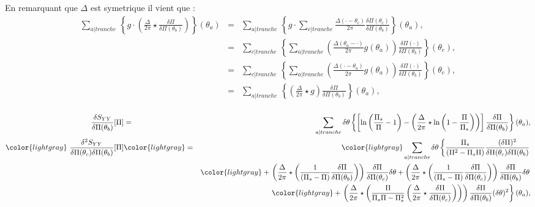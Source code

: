 %	
		
		En remarquant que $\Delta$ est symetrique il vient que : 
	\begin{eqnarray}
		\sum_{a\vert tranche}   \,  \left \{ g  \cdot  	\left  ( \frac{\Delta}{2\pi} \star  \frac{\delta \Pi}{\delta \Pi(\theta_b)} \right ) \right \}( \theta_a) & = & \sum_{a\vert tranche}   \,  \left \{ g  \cdot  \sum_{c\vert tranche}    	
		 \frac{\Delta ( \cdot - \theta_c)}{2\pi}  \frac{\delta \Pi (\theta_c) }{\delta \Pi(\theta_b)}\right \}( \theta_a),\\
		 & = & \sum_{c\vert tranche}   \,  \left \{  \sum_{a\vert tranche}      	
		  \left ( \frac{\Delta ( \theta_a - \cdot )}{2\pi}  g ( \theta_a) \right ) \frac{\delta \Pi (\cdot) }{\delta \Pi(\theta_b)}\right \}( \theta_c),\\
		  & = & \sum_{c\vert tranche}  \,  \left \{  \sum_{a\vert tranche}      	
		  \left ( \frac{\Delta ( \cdot - \theta_a)}{2\pi}  g ( \theta_a) \right ) \frac{\delta \Pi (\cdot) }{\delta \Pi(\theta_b)}\right \}( \theta_c),\\
		  & = & \sum_{a\vert tranche}   \,  \left \{        	
		  \left ( \frac{\Delta}{2\pi}   \star g \right ) \frac{\delta \Pi  }{\delta \Pi(\theta_b)}\right \}( \theta_a),\\
	\end{eqnarray}	
	
	\begin{eqnarray}
			\frac{ \delta S_{YY} }{ \delta \Pi(\theta_b)} [\Pi ]  & = & \sum_{a\vert tranche}   \delta \theta \left \{ \left [ \ln \left ( \frac{ \Pi_s }{ \Pi} - 1 \right ) -  \left ( \frac{ \Delta}{2 \pi} \star \ln \left ( 1 - \frac{ \Pi}{ \Pi_s}\right )  \right)\right ]\frac{\delta \Pi }{ \delta \Pi (\theta_b) } \right \} ( \theta_	a ),\\
			{\color{lightgray} \frac{ \delta^2 S_{YY} }{ \delta \Pi(\theta_c) \delta \Pi(\theta_b)  } [\Pi ]}  &  \color{lightgray} = & {\color{lightgray} \sum_{a \vert tranche}   \delta \theta \left \{  \frac{\Pi_s}{(\Pi^2  - \Pi_s\Pi)} \frac{(\delta \Pi)^2}{ \delta \Pi(\theta_c) \delta \Pi(\theta_b)  } \right .} \\
		&  & \color{lightgray}  +  \left . \left (  \frac{\Delta}{2\pi} \star \left ( \frac{1 }{(\Pi_s -\Pi) }  \frac{\delta \Pi}{\delta \Pi(\theta_b)}  \right )   \right ) \frac{\delta \Pi}{\delta \Pi(\theta_c)} \delta \theta+  \left (  \frac{\Delta}{2\pi} \star \left ( \frac{1}{( \Pi_s -  \Pi) } \frac{\delta \Pi}{\delta \Pi(\theta_c)} \right) \right )\frac{\delta \Pi}{\delta \Pi(\theta_b)} \delta \theta  \right . \\
		& & \color{lightgray} + \left .  \left (  \frac{\Delta}{2\pi} \star \left ( \frac{\Pi }{\Pi_s\Pi - \Pi_s^2 }\left (  \frac{\Delta}{2\pi} \star\frac{\delta \Pi}{\delta \Pi(\theta_c)} \right )\right ) \right ) \frac{\delta \Pi}{\delta \Pi(\theta_b)} (\delta \theta)^2  \right \}(\theta_a),	
	\end{eqnarray}
	
